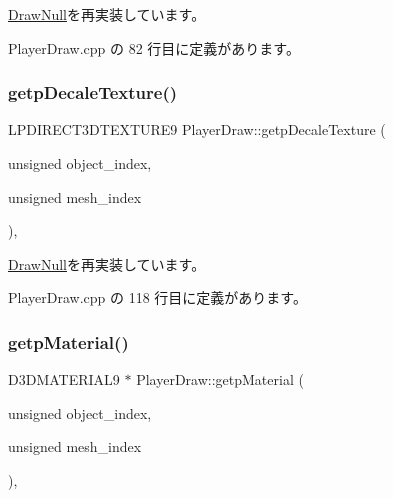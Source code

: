 \mbox{\hyperlink{class_draw_null_a7586cc78eed6bcaf2972ad7a6a70e665}{Draw\+Null}}を再実装しています。



 Player\+Draw.\+cpp の 82 行目に定義があります。

\mbox{\label{class_player_draw_ae69b46285241f390fbf62f6af2b5340d}} 
\subsubsection{\texorpdfstring{getp\+Decale\+Texture()}{getpDecaleTexture()}}
{\footnotesize\ttfamily L\+P\+D\+I\+R\+E\+C\+T3\+D\+T\+E\+X\+T\+U\+R\+E9 Player\+Draw\+::getp\+Decale\+Texture (\begin{DoxyParamCaption}\item[{unsigned}]{object\+\_\+index,  }\item[{unsigned}]{mesh\+\_\+index }\end{DoxyParamCaption})\hspace{0.3cm}{\ttfamily [override]}, {\ttfamily [virtual]}}



\mbox{\hyperlink{class_draw_null_a2dfa2d2cbb66249f933420a38e9cadad}{Draw\+Null}}を再実装しています。



 Player\+Draw.\+cpp の 118 行目に定義があります。

\mbox{\label{class_player_draw_acb94ea7611a99698507321e44b7e9acb}} 
\subsubsection{\texorpdfstring{getp\+Material()}{getpMaterial()}}
{\footnotesize\ttfamily D3\+D\+M\+A\+T\+E\+R\+I\+A\+L9 $\ast$ Player\+Draw\+::getp\+Material (\begin{DoxyParamCaption}\item[{unsigned}]{object\+\_\+index,  }\item[{unsigned}]{mesh\+\_\+index }\end{DoxyParamCaption})\hspace{0.3cm}{\ttfamily [override]}, {\ttfamily [virtual]}}



